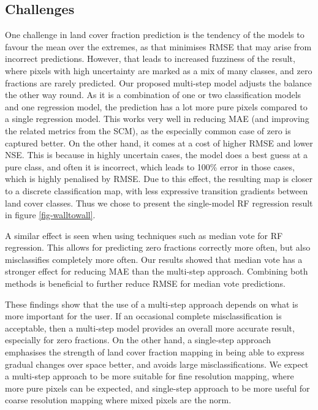 \documentclass[review,authoryear,3p]{elsarticle}
\begin{document}
\subsection{Challenges}

One challenge in land cover fraction prediction is the tendency of the models to favour the mean over the extremes, as that minimises \gls{RMSE} that may arise from incorrect predictions.
However, that leads to increased fuzziness of the result, where pixels with high uncertainty are marked as a mix of many classes, and zero fractions are rarely predicted.
Our proposed multi-step model adjusts the balance the other way round.
As it is a combination of one or two classification models and one regression model, the prediction has a lot more pure pixels compared to a single regression model.
This works very well in reducing \gls{MAE} (and improving the related metrics from the \gls{SCM}), as the especially common case of zero is captured better.
On the other hand, it comes at a cost of higher \gls{RMSE} and lower \gls{NSE}.
This is because in highly uncertain cases, the model does a best guess at a pure class, and often it is incorrect, which leads to 100\% error in those cases, which is highly penalised by \gls{RMSE}.
Due to this effect, the resulting map is closer to a discrete classification map, with less expressive transition gradients between land cover classes.
Thus we chose to present the single-model \gls{RF} regression result in figure \ref{fig-walltowall}.

A similar effect is seen when using techniques such as median vote for \gls{RF} regression.
This allows for predicting zero fractions correctly more often, but also misclassifies completely more often.
Our results showed that median vote has a stronger effect for reducing \gls{MAE} than the multi-step approach.
Combining both methods is beneficial to further reduce \gls{RMSE} for median vote predictions.

These findings show that the use of a multi-step approach depends on what is more important for the user.
If an occasional complete misclassification is acceptable, then a multi-step model provides an overall more accurate result, especially for zero fractions.
On the other hand, a single-step approach emphasises the strength of land cover fraction mapping in being able to express gradual changes over space better, and avoids large misclassifications.
We expect a multi-step approach to be more suitable for fine resolution mapping, where more pure pixels can be expected, and single-step approach to be more useful for coarse resolution mapping where mixed pixels are the norm.
\end{document}

